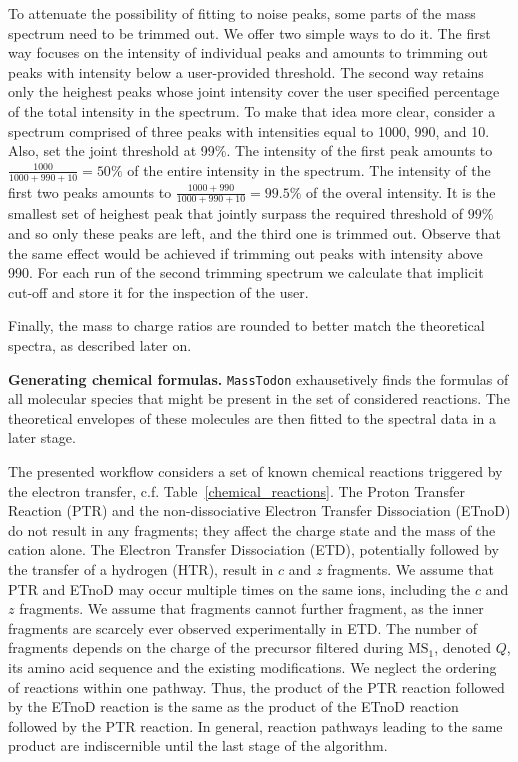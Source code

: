 \documentclass[journal=ancham, manuscript=article, layout=twocolumn]{achemso}
\begin{document}
To attenuate the possibility of fitting to noise peaks, some parts of the mass spectrum need to be trimmed out. 
We offer two simple ways to do it.
The first way focuses on the intensity of individual peaks and amounts to trimming out peaks with intensity below a user-provided threshold.
The second way retains only the heighest peaks whose joint intensity cover the user specified percentage of the total intensity in the spectrum.
To make that idea more clear, consider a spectrum comprised of three peaks with intensities equal to 1000, 990, and 10. 
Also, set the joint threshold at 99\%. 
The intensity of the first peak amounts to $\frac{1000}{1000+990+10} = 50\%$ of the entire intensity in the spectrum. 
The intensity of the first two peaks amounts to $\frac{1000+990}{1000+990+10} = 99.5\%$ of the overal intensity. It is the smallest set of heighest peak that jointly surpass the required threshold of $99\%$ and so only these peaks are left, and the third one is trimmed out. 
Observe that the same effect would be achieved if trimming out peaks with intensity above 990. 
For each run of the second trimming spectrum we calculate that implicit cut-off and store it for the inspection of the user.

Finally, the mass to charge ratios are rounded to better match the theoretical spectra, as described later on.


\noindent\textbf{Generating chemical formulas.} 
{\tt MassTodon} exhausetively finds the formulas of all molecular species that might be present in the set of considered reactions.
The theoretical envelopes of these molecules are then fitted to the spectral data in a later stage. 

The presented workflow considers a set of known chemical reactions triggered by the electron transfer, c.f. Table~\ref{chemical_reactions}. 
The Proton Transfer Reaction (PTR) and the non-dissociative Electron Transfer Dissociation (ETnoD) do not result in any fragments; they affect the charge state and the mass of the cation alone. 
The Electron Transfer Dissociation (ETD), potentially followed by the transfer of a hydrogen (HTR), result in $c$ and $z$ fragments\citep{RoepstorffScheme}. 
We assume that PTR and ETnoD may occur multiple times on the same ions, including the $c$ and $z$ fragments.
We assume that fragments cannot further fragment, as the inner fragments are scarcely ever observed experimentally in ETD.
The number of fragments depends on the charge of the precursor filtered during $\text{MS}_1$, denoted $Q$, its amino acid sequence and the existing modifications. 
We neglect the ordering of reactions within one pathway.
Thus, the product of the PTR reaction followed by the ETnoD reaction is the same as the product of the ETnoD reaction followed by the PTR reaction. 
In general, reaction pathways leading to the same product are indiscernible until the last stage of the algorithm. 
\end{document}
